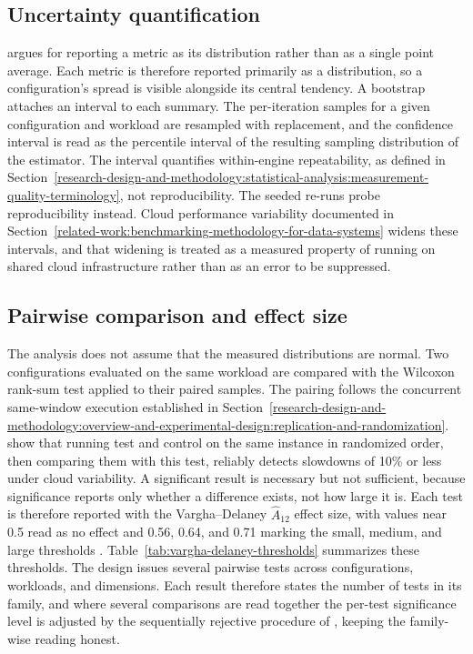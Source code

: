 \subsection{Uncertainty quantification}
\label{research-design-and-methodology:statistical-analysis:uncertainty-quantification}

\textcite{hoefler2015_scientific_benchmarking_parallel} argues for reporting a metric as its distribution rather than as a single point average. Each metric is therefore reported primarily as a distribution, so a configuration's spread is visible alongside its central tendency. A bootstrap attaches an interval to each summary. The per-iteration samples for a given configuration and workload are resampled with replacement, and the confidence interval is read as the percentile interval of the resulting sampling distribution of the estimator. The interval quantifies within-engine repeatability, as defined in Section~\ref{research-design-and-methodology:statistical-analysis:measurement-quality-terminology}, not reproducibility. The seeded re-runs probe reproducibility instead. Cloud performance variability documented in Section~\ref{related-work:benchmarking-methodology-for-data-systems} widens these intervals, and that widening is treated as a measured property of running on shared cloud infrastructure rather than as an error to be suppressed.

\subsection{Pairwise comparison and effect size}
\label{research-design-and-methodology:statistical-analysis:pairwise-comparison-and-effect-size}
The analysis does not assume that the measured distributions are normal. Two configurations evaluated on the same workload are compared with the Wilcoxon rank-sum test applied to their paired samples. The pairing follows the concurrent same-window execution established in Section~\ref{research-design-and-methodology:overview-and-experimental-design:replication-and-randomization}. \textcite{laaber2019_software_microbenchmarking_cloud} show that running test and control on the same instance in randomized order, then comparing them with this test, reliably detects slowdowns of \num{10}\% or less under cloud variability. A significant result is necessary but not sufficient, because significance reports only whether a difference exists, not how large it is. Each test is therefore reported with the Vargha--Delaney $\hat{A}_{12}$ effect size, with values near \num{0.5} read as no effect and \num{0.56}, \num{0.64}, and \num{0.71} marking the small, medium, and large thresholds \parencite{arcuri2014_hitchhiker_statistical_tests}. Table~\ref{tab:vargha-delaney-thresholds} summarizes these thresholds. The design issues several pairwise tests across configurations, workloads, and dimensions. Each result therefore states the number of tests in its family, and where several comparisons are read together the per-test significance level is adjusted by the sequentially rejective procedure of \textcite{holm1979_simple_sequentially_rejective}, keeping the family-wise reading honest.

